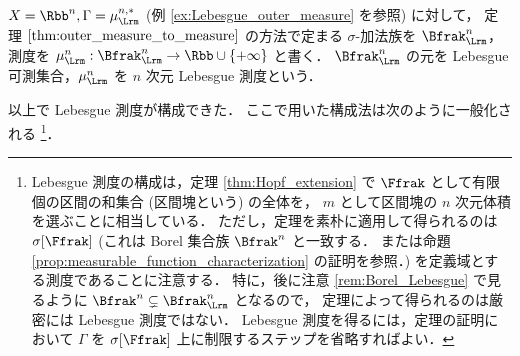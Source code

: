 \begin{example}
    $X=\Rbb^n,\Gamma=\mu_\Lrm^{n,\ast}$ (例 \ref{ex:Lebesgue_outer_measure} を参照) に対して，
    定理 $\ref{thm:outer_measure_to_measure}$ の方法で定まる $\sigma$-加法族を $\Bfrak_\Lrm^n$，
    測度を $\mu_\Lrm^n:\Bfrak_\Lrm^n\to\Rbb\cup\{+\infty\}$ と書く．
    $\Bfrak_\Lrm^n$ の元を Lebesgue 可測集合，$\mu_\Lrm^n$ を $n$ 次元 Lebesgue 測度という．
\end{example}

以上で Lebesgue 測度が構成できた．
ここで用いた構成法は次のように一般化される
\footnote{
    Lebesgue 測度の構成は，定理 \ref{thm:Hopf_extension} で $\Ffrak$ として有限個の区間の和集合 (区間塊という) の全体を，
    $m$ として区間塊の $n$ 次元体積を選ぶことに相当している．
    ただし，定理を素朴に適用して得られるのは $\sigma[\Ffrak]$
    (これは Borel 集合族 $\Bfrak^n$ と一致する．
    \cite[定理 6.4]{It63} または命題 \ref{prop:measurable_function_characterization} の証明を参照．)
    を定義域とする測度であることに注意する．
    特に，後に注意 \ref{rem:Borel_Lebesgue} で見るように $\Bfrak^n\subsetneq\Bfrak_\Lrm^n$ となるので，
    定理によって得られるのは厳密には Lebesgue 測度ではない．
    Lebesgue 測度を得るには，定理の証明において $\Gamma$ を $\sigma[\Ffrak]$ 上に制限するステップを省略すればよい．
}．

